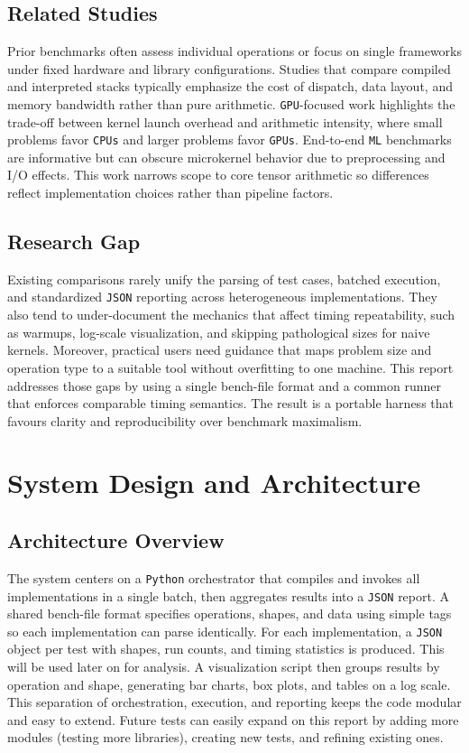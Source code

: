 \documentclass[a4paper,12pt]{article}
\begin{document}
\subsection{Related Studies}
Prior benchmarks often assess individual operations or focus on single frameworks under fixed hardware and library configurations. Studies that compare compiled and interpreted stacks typically emphasize the cost of dispatch, data layout, and memory bandwidth rather than pure arithmetic. \texttt{GPU}-focused work highlights the trade-off between kernel launch overhead and arithmetic intensity, where small problems favor \texttt{CPUs} and larger problems favor \texttt{GPUs}. End-to-end \texttt{ML} benchmarks are informative but can obscure microkernel behavior due to preprocessing and I/O effects. This work narrows scope to core tensor arithmetic so differences reflect implementation choices rather than pipeline factors.

\subsection{Research Gap}
Existing comparisons rarely unify the parsing of test cases, batched execution, and standardized \texttt{JSON} reporting across heterogeneous implementations. They also tend to under-document the mechanics that affect timing repeatability, such as warmups, log-scale visualization, and skipping pathological sizes for naive kernels. Moreover, practical users need guidance that maps problem size and operation type to a suitable tool without overfitting to one machine. This report addresses those gaps by using a single bench-file format and a common runner that enforces comparable timing semantics. The result is a portable harness that favours clarity and reproducibility over benchmark maximalism.

\section{System Design and Architecture}
\subsection{Architecture Overview}
The system centers on a \texttt{Python} orchestrator that compiles and invokes all implementations in a single batch, then aggregates results into a \texttt{JSON} report. A shared bench-file format specifies operations, shapes, and data using simple tags so each implementation can parse identically. For each implementation, a \texttt{JSON} object per test with shapes, run counts, and timing statistics is produced. This will be used later on for analysis. A visualization script then groups results by operation and shape, generating bar charts, box plots, and tables on a log scale. This separation of orchestration, execution, and reporting keeps the code modular and easy to extend. Future tests can easily expand on this report by adding more modules (testing more libraries), creating new tests, and refining existing ones.
\end{document}
